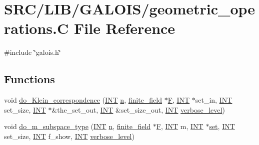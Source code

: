 \hypertarget{geometric__operations_8_c}{}\section{S\+R\+C/\+L\+I\+B/\+G\+A\+L\+O\+I\+S/geometric\+\_\+operations.C File Reference}
\label{geometric__operations_8_c}
{\ttfamily \#include \char`\"{}galois.\+h\char`\"{}}\newline
\subsection*{Functions}
\begin{DoxyCompactItemize}
\item 
void \mbox{\hyperlink{geometric__operations_8_c_aa91902d79964fdd71e53be264387b285}{do\+\_\+\+Klein\+\_\+correspondence}} (\mbox{\hyperlink{galois_8h_a09fddde158a3a20bd2dcadb609de11dc}{I\+NT}} \mbox{\hyperlink{simeon_8_c_a7f2cd26777ce0ff3fdaf8d02aacbddfb}{n}}, \mbox{\hyperlink{classfinite__field}{finite\+\_\+field}} $\ast$\mbox{\hyperlink{simeon_8_c_a21a61c535ff7d9d4b674461d3b19fffa}{F}}, \mbox{\hyperlink{galois_8h_a09fddde158a3a20bd2dcadb609de11dc}{I\+NT}} $\ast$set\+\_\+in, \mbox{\hyperlink{galois_8h_a09fddde158a3a20bd2dcadb609de11dc}{I\+NT}} set\+\_\+size, \mbox{\hyperlink{galois_8h_a09fddde158a3a20bd2dcadb609de11dc}{I\+NT}} $\ast$\&the\+\_\+set\+\_\+out, \mbox{\hyperlink{galois_8h_a09fddde158a3a20bd2dcadb609de11dc}{I\+NT}} \&set\+\_\+size\+\_\+out, \mbox{\hyperlink{galois_8h_a09fddde158a3a20bd2dcadb609de11dc}{I\+NT}} \mbox{\hyperlink{simeon_8_c_a818073fbcc2f439e7c56952f67386122}{verbose\+\_\+level}})
\item 
void \mbox{\hyperlink{geometric__operations_8_c_ac4fa2c473beecd661ac7de67a730bb36}{do\+\_\+m\+\_\+subspace\+\_\+type}} (\mbox{\hyperlink{galois_8h_a09fddde158a3a20bd2dcadb609de11dc}{I\+NT}} \mbox{\hyperlink{simeon_8_c_a7f2cd26777ce0ff3fdaf8d02aacbddfb}{n}}, \mbox{\hyperlink{classfinite__field}{finite\+\_\+field}} $\ast$\mbox{\hyperlink{simeon_8_c_a21a61c535ff7d9d4b674461d3b19fffa}{F}}, \mbox{\hyperlink{galois_8h_a09fddde158a3a20bd2dcadb609de11dc}{I\+NT}} m, \mbox{\hyperlink{galois_8h_a09fddde158a3a20bd2dcadb609de11dc}{I\+NT}} $\ast$\mbox{\hyperlink{nauty_8h_a9690bea211101f22a5e154087590c3da}{set}}, \mbox{\hyperlink{galois_8h_a09fddde158a3a20bd2dcadb609de11dc}{I\+NT}} set\+\_\+size, \mbox{\hyperlink{galois_8h_a09fddde158a3a20bd2dcadb609de11dc}{I\+NT}} f\+\_\+show, \mbox{\hyperlink{galois_8h_a09fddde158a3a20bd2dcadb609de11dc}{I\+NT}} \mbox{\hyperlink{simeon_8_c_a818073fbcc2f439e7c56952f67386122}{verbose\+\_\+level}})

\end{DoxyCompactItemize}
